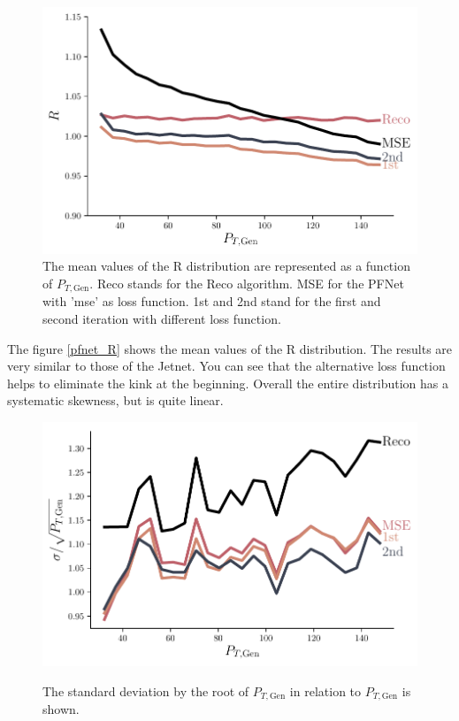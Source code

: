 \documentclass[12pt, a4paper]{thesis}
\begin{document}
\begin{figure}[htbp]
\centering
\includegraphics[width=.9\linewidth]{../images/pfnet_R.pdf}
\caption{\label{fig:orgfd0f576}
The mean values of the R distribution are represented as a function of \(P_{T, \text{Gen}}\). Reco stands for the Reco algorithm. MSE for the PFNet with 'mse' as loss function. 1st and 2nd stand for the first and second iteration with different loss function.}
\end{figure}

The figure \ref{pfnet_R} shows the mean values of the R
distribution. The results are very similar to those of the Jetnet. You
can see that the alternative loss function helps to eliminate the kink
at the beginning.  Overall the entire distribution has a systematic
skewness, but is quite linear.

\begin{figure}[htbp]
\centering
\includegraphics[width=.9\linewidth]{../images/pfnet_res.pdf}
\label{fig:orgdedc16a}
\caption{The standard deviation by the root of \(P_{T, \text{Gen}}\)
in relation to \(P_{T, \text{Gen}}\) is shown.}
\end{figure} 
\end{document}
